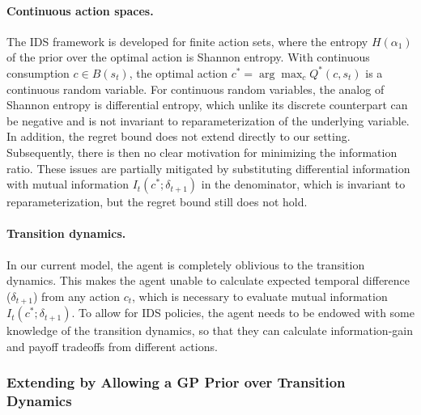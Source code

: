 \paragraph{Continuous action spaces.} The IDS framework is developed for finite action sets, where the entropy
$H(\alpha_1)$ of the prior over the optimal action is Shannon entropy.
With continuous consumption $c \in B(s_t)$, the optimal action $c^* = \arg\max_c Q^*(c, s_t)$ is a
continuous random variable. For continuous random variables, the analog of Shannon
entropy is differential entropy, which unlike its discrete counterpart can be negative and is not invariant to
reparameterization of the underlying variable. In addition, the regret bound does not extend directly to our setting.
Subsequently, there is then no clear motivation for minimizing the information ratio. These issues are partially
mitigated by substituting differential information with mutual information $I_t(c^*; \delta_{t+1})$ in the denominator, 
which is invariant to reparameterization, but the regret bound still does not hold.

\paragraph{Transition dynamics.} In our current model, the agent is completely oblivious
to the transition dynamics. This makes the agent unable to calculate expected temporal difference
($\delta_{t+1}$) from any action $c_t$, which is necessary to evaluate mutual information $I_t(c^*; \delta_{t+1})$.
To allow for IDS policies, the agent needs to be endowed with some knowledge of the transition 
dynamics, so that they can calculate information-gain and payoff tradeoffs from different actions.

\subsubsection{Extending by Allowing a GP Prior over Transition Dynamics} \label{subsubsec:information_directed_extension_gp_transition}

